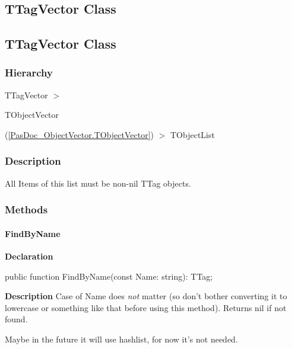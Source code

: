 \documentclass{report}
\newif\ifpdf
\begin{document}
\subsection*{\large{\textbf{TTagVector Class}}\normalsize\hspace{1ex}\hrulefill}
\else
\subsection*{TTagVector Class}
\fi
\label{PasDoc_TagManager.TTagVector}
\subsubsection*{\large{\textbf{Hierarchy}}\normalsize\hspace{1ex}\hfill}
TTagVector {$>$} \begin{ttfamily}TObjectVector\end{ttfamily}(\ref{PasDoc_ObjectVector.TObjectVector}) {$>$} 
TObjectList
\subsubsection*{\large{\textbf{Description}}\normalsize\hspace{1ex}\hfill}
All Items of this list must be non{-}nil TTag objects.\subsubsection*{\large{\textbf{Methods}}\normalsize\hspace{1ex}\hfill}
\paragraph*{FindByName}\hspace*{\fill}

\label{PasDoc_TagManager.TTagVector-FindByName}
\begin{list}{}{
\setlength{\itemindent}{0cm}
\setlength{\listparindent}{0cm}
\setlength{\leftmargin}{\evensidemargin}
\addtolength{\leftmargin}{\tmplength}
\settowidth{\labelsep}{X}
\addtolength{\leftmargin}{\labelsep}
\setlength{\labelwidth}{\tmplength}
}
\item[\textbf{Declaration}\hfill]
\ifpdf
\begin{flushleft}
\fi
\begin{ttfamily}
public function FindByName(const Name: string): TTag;\end{ttfamily}

\ifpdf
\end{flushleft}
\fi

\par
\item[\textbf{Description}]
Case of Name does \textit{not} matter (so don't bother converting it to lowercase or something like that before using this method). Returns nil if not found.

Maybe in the future it will use hashlist, for now it's not needed.

\end{list}
\ifpdf
\end{document}

